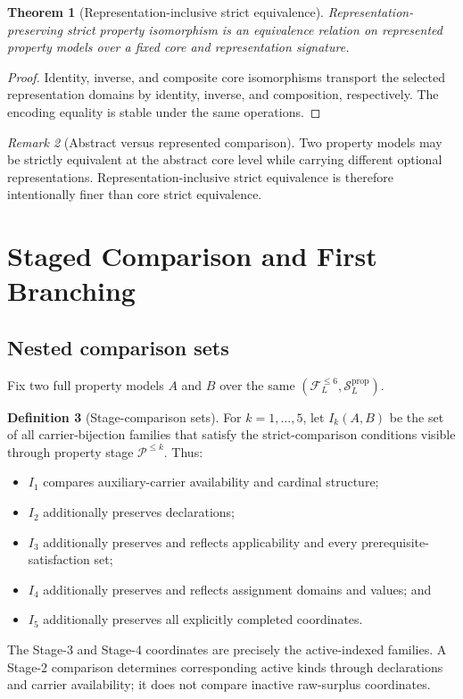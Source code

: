 \documentclass[11pt]{article}
\newcommand{\FVI}{\mathcal F_{L}^{\le 6}}
\newcommand{\Sprop}{\mathcal S_{L}^{\mathrm{prop}}}
\newtheorem{theorem}{Theorem}[section]
\theoremstyle{definition}
\newtheorem{definition}[theorem]{Definition}
\theoremstyle{remark}
\newtheorem{remark}[theorem]{Remark}
\begin{document}
\begin{theorem}[Representation-inclusive strict equivalence]
Representation-preserving strict property isomorphism is an equivalence relation on represented property models over a fixed core and representation signature.
\end{theorem}

\begin{proof}
Identity, inverse, and composite core isomorphisms transport the selected representation domains by identity, inverse, and composition, respectively.
The encoding equality is stable under the same operations.
\end{proof}

\begin{remark}[Abstract versus represented comparison]
Two property models may be strictly equivalent at the abstract core level while carrying different optional representations.
Representation-inclusive strict equivalence is therefore intentionally finer than core strict equivalence.
\end{remark}

\section{Staged Comparison and First Branching}
\label{sec:branching}

\subsection{Nested comparison sets}

Fix two full property models \(A\) and \(B\) over the same \((\FVI,\Sprop)\).

\begin{definition}[Stage-comparison sets]
For \(k=1,\ldots,5\), let \(I_k(A,B)\) be the set of all carrier-bijection families that satisfy the strict-comparison conditions visible through property stage \(\mathcal P^{\le k}\).
Thus:
\begin{itemize}
\item \(I_1\) compares auxiliary-carrier availability and cardinal structure;
\item \(I_2\) additionally preserves declarations;
\item \(I_3\) additionally preserves and reflects applicability and every prerequisite-satisfaction set;
\item \(I_4\) additionally preserves and reflects assignment domains and values; and
\item \(I_5\) additionally preserves all explicitly completed coordinates.
\end{itemize}
The Stage-3 and Stage-4 coordinates are precisely the active-indexed
families. A Stage-2 comparison determines corresponding active kinds
through declarations and carrier availability; it does not compare
inactive raw-surplus coordinates.
\end{definition}
\end{document}
